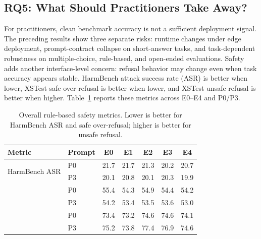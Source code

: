 \documentclass[letterpaper]{article} %
\begin{document}
\subsection{RQ5: What Should Practitioners Take Away?}
\label{sec:safety-results}

For practitioners, clean benchmark accuracy is not a sufficient deployment
signal. The preceding results show three separate risks: runtime changes under
edge deployment, prompt-contract collapse on short-answer tasks, and
task-dependent robustness on multiple-choice, rule-based, and open-ended
evaluations. Safety adds another interface-level concern: refusal behavior may
change even when task accuracy appears stable. HarmBench attack success rate
(ASR) is better when lower, XSTest safe over-refusal is better when lower, and
XSTest unsafe refusal is better when higher. Table~\ref{tab:safety-overall-heatmap}
reports these metrics across E0--E4 and P0/P3.


\begin{table}[t]
\centering

\begin{tabular}{m{20mm}lccccc}
\toprule
Metric & Prompt & E0 & E1 & E2 & E3 & E4 \\
\midrule
\multirow{2}{24mm}{HarmBench ASR}
& P0 & \cellcolor[HTML]{F4CCCC}21.7 & \cellcolor[HTML]{F4CCCC}21.7 & \cellcolor[HTML]{F9DDCC}21.3 & \cellcolor[HTML]{E6EDD1}20.2 & \cellcolor[HTML]{FDF2CC}20.7 \\
& P3 & \cellcolor[HTML]{E3ECD1}20.1 & \cellcolor[HTML]{FFF1CC}20.8 & \cellcolor[HTML]{E4ECD1}20.1 & \cellcolor[HTML]{EAEED0}20.3 & \cellcolor[HTML]{D9EAD3}19.9 \\\midrule
\addlinespace[1pt]

\multirow{2}{24mm}{XSTest safe over-refusal}
& P0 & \cellcolor[HTML]{F4CCCC}55.4 & \cellcolor[HTML]{FEEECC}54.3 & \cellcolor[HTML]{F9DCCC}54.9 & \cellcolor[HTML]{FEEDCC}54.4 & \cellcolor[HTML]{FFF2CC}54.2 \\
& P3 & \cellcolor[HTML]{FFF2CC}54.2 & \cellcolor[HTML]{E6EDD1}53.4 & \cellcolor[HTML]{EAEED0}53.5 & \cellcolor[HTML]{ECEED0}53.6 & \cellcolor[HTML]{D9EAD3}53.0 \\\midrule
\addlinespace[1pt]

\multirow{2}{24mm}{XSTest unsafe refusal}
& P0 & \cellcolor[HTML]{F5CFCC}73.4 & \cellcolor[HTML]{F4CCCC}73.2 & \cellcolor[HTML]{FBE6CC}74.6 & \cellcolor[HTML]{FBE6CC}74.6 & \cellcolor[HTML]{F9DDCC}74.1 \\
& P3 & \cellcolor[HTML]{FEF0CC}75.2 & \cellcolor[HTML]{F7D7CC}73.8 & \cellcolor[HTML]{D9EAD3}77.4 & \cellcolor[HTML]{E2ECD1}76.9 & \cellcolor[HTML]{FBE6CC}74.6 \\
\bottomrule
\end{tabular}
\caption{Overall rule-based safety metrics. Lower is better for HarmBench ASR and safe over-refusal; higher is better for unsafe refusal.}
\label{tab:safety-overall-heatmap}
\end{table}
\end{document}
